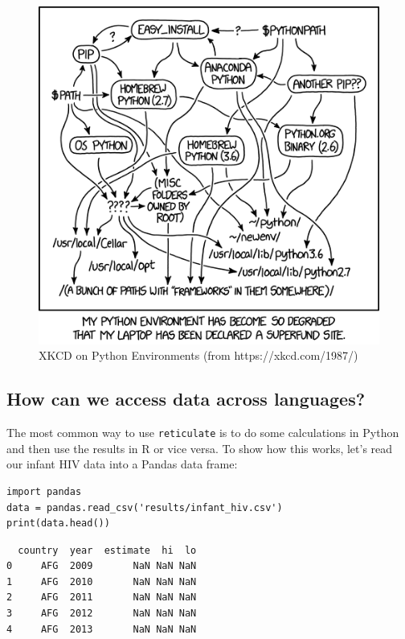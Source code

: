 \begin{figure}[h]
  \includegraphics[width=6.83in]{figures/advanced/python-environment}
  \caption{XKCD on Python Environments (from https://xkcd.com/1987/)}
  \label{fig:xkcd}
\end{figure}

\subsection*{How can we access data across languages?}

The most common way to use \texttt{reticulate} is
to do some calculations in Python and then use the results in R
or vice versa.
To show how this works,
let's read our infant HIV data into a Pandas data frame:

\begin{lstlisting}
import pandas
data = pandas.read_csv('results/infant_hiv.csv')
print(data.head())
\end{lstlisting}

\begin{lstlisting}
  country  year  estimate  hi  lo
0     AFG  2009       NaN NaN NaN
1     AFG  2010       NaN NaN NaN
2     AFG  2011       NaN NaN NaN
3     AFG  2012       NaN NaN NaN
4     AFG  2013       NaN NaN NaN
\end{lstlisting}

